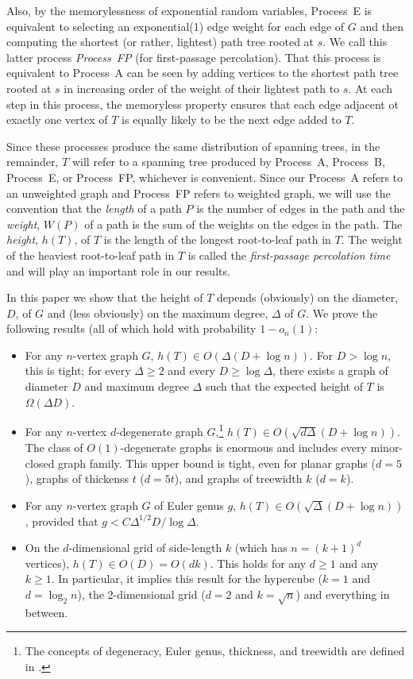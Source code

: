 \documentclass[lotsofwhite]{patmorin}
\begin{document}
Also, by the memorylessness of exponential random variables, Process~E
is equivalent to selecting an exponential(1) edge weight for each edge
of $G$ and then computing the shortest (or rather, lightest) path
tree rooted at $s$.  We call this latter process \emph{Process~FP}
(for first-passage percolation).  That this process is equivalent to
Process~A can be seen by adding vertices to the shortest path tree rooted
at $s$ in increasing order of the weight of their lightest path to $s$.
At each step in this process, the memoryless property ensures that each
edge adjacent ot exactly one vertex of $T$ is equally likely to be the
next edge added to $T$.  

Since these processes produce the same distribution of spanning trees,
in the remainder, $T$ will refer to a spanning tree produced by Process~A,
Process~B, Process~E, or Process~FP, whichever is convenient.  Since our
Process~A refers to an unweighted graph and Process~FP refers to weighted
graph, we will use the convention that the \emph{length} of a path $P$ is
the number of edges in the path and the \emph{weight}, $W(P)$ of a path
is the sum of the weights on the edges in the path. The \emph{height},
$h(T)$, of $T$ is the length of the longest root-to-leaf path in $T$.
The weight of the heaviest root-to-leaf path in $T$ is called the
\emph{first-passage percolation time} and will play an important role
in our results.

In this paper we show that the height of $T$ depends (obviously)
on the diameter, $D$, of $G$ and (less obviously) on the maximum degree,
$\Delta$ of $G$.  We prove the following results (all of which hold
with probability $1-o_n(1)$:

\begin{itemize}
  \item For any $n$-vertex graph $G$, $h(T)\in O(\Delta(D+\log n))$.
  For $D>\log n$, this is tight; for every $\Delta\ge 2$ and every $D \ge
  \log\Delta$, there exists a graph of diameter $D$ and maximum degree
  $\Delta$ such that the expected height of $T$ is $\Omega(\Delta D)$.

  \item For any $n$-vertex $d$-degenerate graph $G$,\footnote{The concepts
  of degeneracy, Euler genus, thickness, and treewidth are defined in
  .} $h(T)\in O(\sqrt{d\Delta}(D+\log n))$.
  The class of $O(1)$-degenerate graphs is enormous and includes every
  minor-closed graph family.  This upper bound is tight, even for
  planar graphs ($d=5$), graphs of thickenss $t$ ($d=5t$), and graphs
  of treewidth $k$ ($d=k$).

  \item For any $n$-vertex graph $G$ of Euler genus $g$,
  $h(T)\in O(\sqrt{\Delta}(D+\log n))$, provided that $g <
  C\Delta^{1/2}D/\log\Delta$.

  \item On the $d$-dimensional grid of side-length $k$ (which has
  $n=(k+1)^d$ vertices), $h(T)\in O(D)=O(dk)$. This holds for any $d\ge
  1$ and any $k\ge 1$.  In particular, it implies this result for the
  hypercube ($k=1$ and $d=\log_2 n$), the 2-dimensional grid ($d=2$
  and $k=\sqrt{n}$) and everything in between.
\end{itemize}
\end{document}
